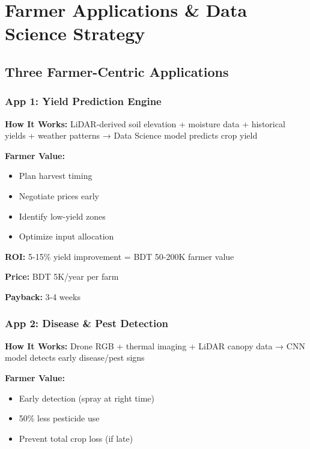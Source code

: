 
\chapter{Farmer Applications \& Data Science Strategy}

\section{Three Farmer-Centric Applications}

\subsection{App 1: Yield Prediction Engine}

\textbf{How It Works:} LiDAR-derived soil elevation + moisture data + historical yields + weather patterns → Data Science model predicts crop yield

\textbf{Farmer Value:}
\begin{itemize}
    \item Plan harvest timing
    \item Negotiate prices early
    \item Identify low-yield zones
    \item Optimize input allocation
\end{itemize}

\textbf{ROI:} 5-15\% yield improvement = BDT 50-200K farmer value

\textbf{Price:} BDT 5K/year per farm

\textbf{Payback:} 3-4 weeks

\subsection{App 2: Disease \& Pest Detection}

\textbf{How It Works:} Drone RGB + thermal imaging + LiDAR canopy data → CNN model detects early disease/pest signs

\textbf{Farmer Value:}
\begin{itemize}
    \item Early detection (spray at right time)
    \item 50\% less pesticide use
    \item Prevent total crop loss (if late)
\end{itemize}

